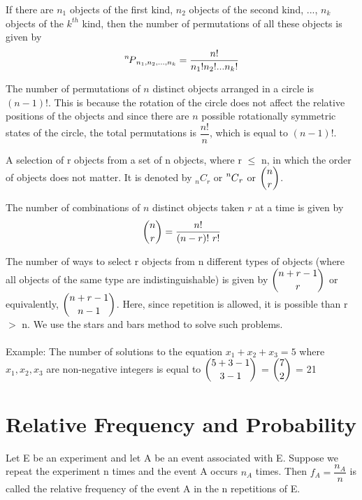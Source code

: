 \begin{note}\end{note}
If there are $n_1$ objects of the first kind, $n_2$ objects of the second kind, ..., $n_k$ objects of the $k^{th}$ kind, then the number of permutations of all these objects is given by 
$$
\prescript{n\mkern-2.5mu}{}P_{n_1, n_2, \dots, n_k} = \dfrac{n!}{n_1 ! n_2 ! ... n_k !}
$$


\begin{note}\end{note}
The number of permutations of $n$ distinct objects arranged in a circle is $(n-1)!$. This is because the rotation of the circle does not affect the relative positions of the objects and since there are $n$ possible rotationally symmetric states of the circle, the total permutations is $\dfrac{n!}{n}$, which is equal to $(n-1)!$.


\begin{definition}[Combination]
A selection of r objects from a set of n objects, where r $\leq$ n, in which the order of objects does not matter. It is denoted by $_nC_r$ or  $\prescript{n\mkern-0.5mu}{}C_{r}$ or $\dbinom{n}{r}$.
\end{definition}

\begin{note}\end{note}
The number of combinations of $n$ distinct objects taken $r$ at a time is given by 
$$
\dbinom{n}{r} = \dfrac{n!}{(n-r)!\  r!}
$$


\begin{note}\end{note}
The number of ways to select r objects from n different types of objects (where all objects of the same type are indistinguishable) is given by $\dbinom{n+r-1}{r}$ or equivalently, $\dbinom{n+r-1}{n-1}$. Here, since repetition is allowed, it is possible than r $>$ n. We use the stars and bars method to solve such problems. \\ \hfill \\
Example: The number of solutions to the equation $x_1 + x_2 + x_3 = 5$ where $x_1, x_2, x_3$ are non-negative integers is equal to $\dbinom{5+3-1}{3-1}$ = $\dbinom{7}{2}$ = 21


\section{Relative Frequency and Probability}

\begin{definition}
Let E be an experiment and let A be an event associated with E. Suppose we repeat the experiment n times and the event A occurs $n_A$ times. Then $f_A = \dfrac{n_A}{n}$ is called the relative frequency of the event A in the n repetitions of E.
\end{definition}

